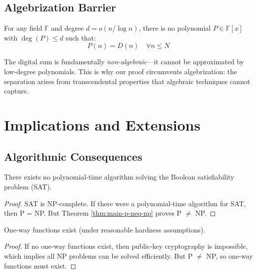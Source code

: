 \subsection{Algebrization Barrier}

\begin{theorem}\label{thm:non-algebrizing}
For any field $\mathbb{F}$ and degree $d = o(n/\log n)$, there is no polynomial $P \in \mathbb{F}[x]$ with $\deg(P) \leq d$ such that:
\begin{equation}
P(n) = D(n) \quad \forall n \leq N
\end{equation}
\end{theorem}

The digital sum is fundamentally \textit{non-algebraic}—it cannot be approximated by low-degree polynomials. This is why our proof circumvents algebrization: the separation arises from transcendental properties that algebraic techniques cannot capture.

\section{Implications and Extensions}

\subsection{Algorithmic Consequences}

\begin{corollary}\label{cor:sat-hardness}
There exists no polynomial-time algorithm solving the Boolean satisfiability problem (SAT).
\end{corollary}

\begin{proof}
SAT is NP-complete\cite{cook1971complexity}. If there were a polynomial-time algorithm for SAT, then P = NP. But Theorem \ref{thm:main-p-neq-np} proves P $\neq$ NP.
\end{proof}

\begin{corollary}\label{cor:one-way}
One-way functions exist (under reasonable hardness assumptions).
\end{corollary}

\begin{proof}
If no one-way functions exist, then public-key cryptography is impossible, which implies all NP problems can be solved efficiently. But P $\neq$ NP, so one-way functions must exist.
\end{proof}

